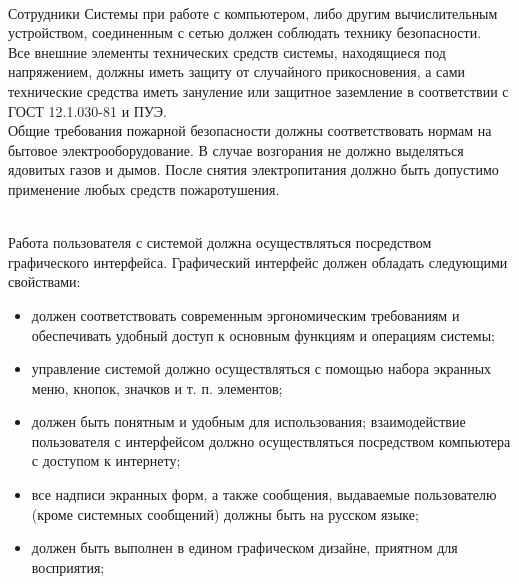 \documentclass[russian, utf8, 12pt,pointsubsection,floatsubsection]{eskdtext}
\begin{document}
\\

Сотрудники Системы при работе с компьютером, либо другим вычислительным устройством, соединенным с сетью должен соблюдать технику безопасности.\\

Все внешние элементы технических средств системы, находящиеся под напряжением, должны иметь защиту от случайного прикосновения, а сами технические средства иметь зануление или защитное заземление в соответствии с ГОСТ 12.1.030-81 и ПУЭ.\\

Общие требования пожарной безопасности должны соответствовать нормам на бытовое электрооборудование. В случае возгорания не должно выделяться ядовитых газов и дымов. После снятия электропитания должно быть допустимо применение любых средств пожаротушения.


\\

Работа пользователя с системой должна осуществляться посредством графического интерфейса. Графический интерфейс должен обладать следующими свойствами:
\begin{itemize}
    \item должен соответствовать современным эргономическим требованиям и обеспечивать удобный доступ к основным функциям и операциям системы;
    \item управление системой должно осуществляться с помощью набора экранных меню, кнопок, значков и т. п. элементов;
    \item должен быть понятным и удобным для использования;
взаимодействие пользователя с интерфейсом должно осуществляться посредством компьютера с доступом к интернету;
    \item все надписи экранных форм, а также сообщения, выдаваемые
пользователю (кроме системных сообщений) должны быть на русском языке;
    \item должен быть выполнен в едином графическом дизайне, приятном для восприятия;
\end{itemize}
\end{document}
